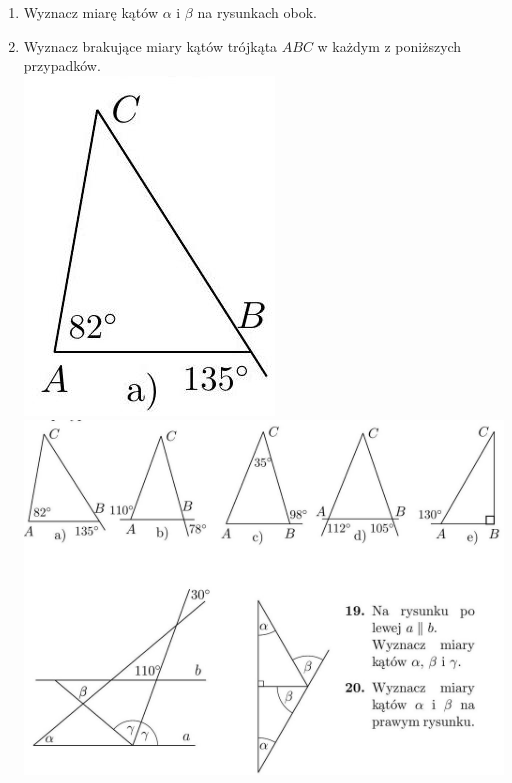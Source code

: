 \documentclass[10pt]{article}
\begin{document}
\begin{enumerate}
  \item Wyznacz miarę kątów \(\alpha\) i \(\beta\) na rysunkach obok.
  \item Wyznacz brakujące miary kątów trójkąta \(A B C\) w każdym z poniższych przypadków.\\
\includegraphics[max width=\textwidth, center]{2024_11_21_8f01584889ff06348ae7g-192}\\
\includegraphics[max width=\textwidth, center]{2024_11_21_8f01584889ff06348ae7g-192(2)}

\end{enumerate}
\end{document}
